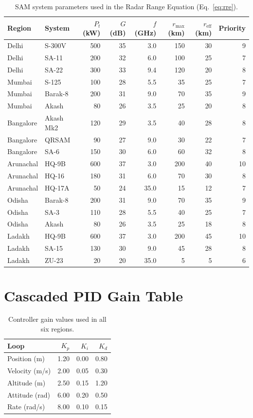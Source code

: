 ﻿\documentclass{article}
\begin{document}
\begin{table}[h]
\centering
\caption{SAM system parameters used in the Radar Range Equation (Eq.~\ref{eq:rre}).}
\small
\begin{tabular}{llrrrrrr}
\toprule
Region & System & $P_t$ (kW) & $G$ (dB) & $f$ (GHz) & $r_\text{max}$ (km) & $r_\text{eff}$ (km) & Priority \\
\midrule
Delhi & S-300V & 500 & 35 & 3.0 & 150 & 30 & 9 \\
Delhi & SA-11  & 200 & 32 & 6.0 & 100 & 25 & 7 \\
Delhi & SA-22  & 300 & 33 & 9.4 & 120 & 20 & 8 \\
Mumbai & S-125  & 100 & 28 & 5.5 &  35 & 25 & 7 \\
Mumbai & Barak-8 & 200 & 31 & 9.0 &  70 & 35 & 9 \\
Mumbai & Akash  &  80 & 26 & 3.5 &  25 & 20 & 8 \\
Bangalore & Akash Mk2 & 120 & 29 & 3.5 & 40 & 28 & 8 \\
Bangalore & QRSAM     &  90 & 27 & 9.0 & 30 & 22 & 7 \\
Bangalore & SA-6      & 150 & 30 & 6.0 & 60 & 32 & 8 \\
Arunachal & HQ-9B  & 600 & 37 & 3.0 & 200 & 40 & 10 \\
Arunachal & HQ-16  & 180 & 31 & 6.0 &  70 & 30 &  8 \\
Arunachal & HQ-17A &  50 & 24 & 35.0 &  15 & 12 &  7 \\
Odisha & Barak-8  & 200 & 31 & 9.0 &  70 & 35 & 9 \\
Odisha & SA-3     & 110 & 28 & 5.5 &  40 & 25 & 7 \\
Odisha & Akash    &  80 & 26 & 3.5 &  25 & 18 & 8 \\
Ladakh & HQ-9B  & 600 & 37 & 3.0 & 200 & 45 & 10 \\
Ladakh & SA-15  & 130 & 30 & 9.0 &  45 & 28 &  8 \\
Ladakh & ZU-23  &  20 & 20 & 35.0 &   5 &  5 &  6 \\
\bottomrule
\end{tabular}
\end{table}

\section{Cascaded PID Gain Table}
\label{app:pid_gains}

\begin{table}[h]
\centering
\caption{Controller gain values used in all six regions.}
\begin{tabular}{lrrr}
\toprule
Loop & $K_p$ & $K_i$ & $K_d$ \\
\midrule
Position (m)    & 1.20 & 0.00 & 0.80 \\
Velocity (m/s)  & 2.00 & 0.05 & 0.30 \\
Altitude (m)    & 2.50 & 0.15 & 1.20 \\
Attitude (rad)  & 6.00 & 0.20 & 0.50 \\
Rate (rad/s)    & 8.00 & 0.10 & 0.15 \\
\bottomrule
\end{tabular}
\end{table}
\end{document}
